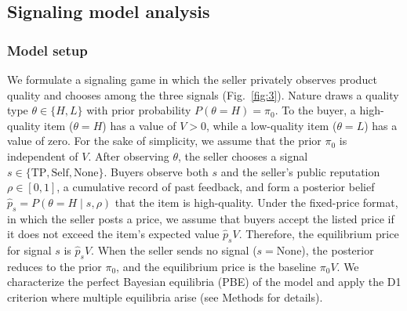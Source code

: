 \documentclass[11pt,letterpaper]{article}
\theoremstyle{definition}
\begin{document}
\subsection*{Signaling model analysis}

\subsubsection*{Model setup}

We formulate a signaling game in which the seller privately observes product quality and chooses among the three signals (Fig.~\ref{fig:3}). Nature draws a quality type $\theta \in \{H, L\}$ with prior probability $P(\theta = H) = \pi_0$. To the buyer, a high-quality item ($\theta = H$) has a value of $V > 0$, while a low-quality item ($\theta = L$) has a value of zero. For the sake of simplicity, we assume that the prior $\pi_0$ is independent of $V$. After observing $\theta$, the seller chooses a signal $s \in \{\text{TP}, \text{Self}, \text{None}\}$. Buyers observe both $s$ and the seller's public reputation $\rho \in [0, 1]$, a cumulative record of past feedback, and form a posterior belief $\hat{p}_s = P(\theta = H \mid s, \rho)$ that the item is high-quality. Under the fixed-price format, in which the seller posts a price, we assume that buyers accept the listed price if it does not exceed the item's expected value $\hat{p}_s V$. Therefore, the equilibrium price for signal $s$ is $\hat{p}_s V$. When the seller sends no signal ($s = \text{None}$), the posterior reduces to the prior $\pi_0$, and the equilibrium price is the baseline $\pi_0 V$. We characterize the perfect Bayesian equilibria (PBE) of the model and apply the D1 criterion \citep{ChoKreps1987, BanksSobel1987, ChoSobel1990} where multiple equilibria arise (see Methods for details).
\end{document}
